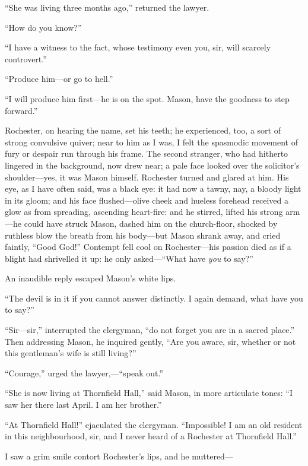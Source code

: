 \enquote{She was living three months ago,} returned the lawyer.

\enquote{How do you know?}

\enquote{I have a witness to the fact, whose testimony even you, sir,
will scarcely controvert.}

\enquote{Produce him---or go to hell.}

\enquote{I will produce him first---he is on the spot. \Mr{} Mason, have
the goodness to step forward.}

\Mr{} Rochester, on hearing the name, set his teeth; he experienced, too,
a sort of strong convulsive quiver; near to him as I was, I felt the
spasmodic movement of fury or despair run through his frame. The second
stranger, who had hitherto lingered in the background, now drew near; a
pale face looked over the solicitor's shoulder---yes, it was Mason
himself. \Mr{} Rochester turned and glared at him. His eye, as I have
often said, was a black eye: it had now a tawny, nay, a bloody light in
its gloom; and his face flushed---olive cheek and hueless forehead
received a glow as from spreading, ascending heart-fire: and he stirred,
lifted his strong arm---he could have struck Mason, dashed him on the
church-floor, shocked by ruthless blow the breath from his body---but
Mason shrank away, and cried faintly, \enquote{Good God!} Contempt fell
cool on \Mr{} Rochester---his passion died as if a blight had shrivelled
it up: he only asked---\enquote{What have \emph{you} to say?}

An inaudible reply escaped Mason's white lips.

\enquote{The devil is in it if you cannot answer distinctly. I again
demand, what have you to say?}

\enquote{Sir---sir,} interrupted the clergyman, \enquote{do not forget
you are in a sacred place.} Then addressing Mason, he inquired gently,
\enquote{Are you aware, sir, whether or not this gentleman's wife is
still living?}

\enquote{Courage,} urged the lawyer,---\enquote{speak out.}

\enquote{She is now living at Thornfield Hall,} said Mason, in more
articulate tones: \enquote{I saw her there last April. I am her
brother.}

\enquote{At Thornfield Hall!} ejaculated the clergyman. 
\enquote{Impossible! I am an old resident in this neighbourhood, sir,
and I never heard of a \Mrs{} Rochester at Thornfield Hall.}

I saw a grim smile contort \Mr{} Rochester's lips, and he muttered---

